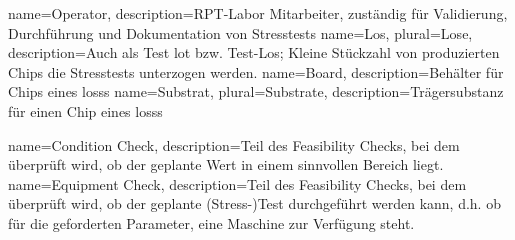 {
    name=Operator,
    description={RPT-Labor Mitarbeiter, zuständig für Validierung, Durchführung und Dokumentation von Stresstests}
}
{
    name=Los,
    plural=Lose,
    description={Auch als Test lot bzw. Test-Los; Kleine Stückzahl von produzierten Chips die Stresstests unterzogen werden.}
}
{
    name=Board,
    description={Behälter für Chips eines \glspl{los}s}
}
{
    name=Substrat,
    plural=Substrate,
    description={Trägersubstanz für einen Chip eines \glspl{los}s}
}

{
    name=Condition Check,
    description={Teil des Feasibility Checks, bei dem überprüft wird, ob der geplante Wert in einem sinnvollen Bereich liegt.}
}
{
    name=Equipment Check,
    description={Teil des Feasibility Checks, bei dem überprüft wird, ob der geplante (Stress-)Test durchgeführt werden kann, d.h. ob für die geforderten Parameter, eine Maschine zur Verfügung steht.}
}



